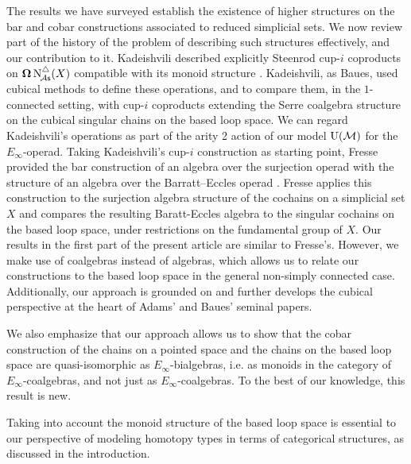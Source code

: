The results we have surveyed establish the existence of higher structures on the bar and cobar constructions associated to reduced simplicial sets.
We now review part of the history of the problem of describing such structures effectively, and our contribution to it.
Kadeishvili described explicitly Steenrod cup-$i$ coproducts on $\operatorname{\mathbf{\Omega}} \operatorname{N^{\triangle}_{\!{\mathcal{A}\mathsf{s}}}}(X)$ compatible with its monoid structure \cite{kadeishvili1999coproducts, kadeishvili2003cupi}.
Kadeishvili, as Baues, used cubical methods to define these operations, and to compare them, in the $1$-connected setting, with cup-$i$ coproducts extending the Serre coalgebra structure on the cubical singular chains on the based loop space.
We can regard Kadeishvili's operations as part of the arity 2 action of our model ${\operatorname{U}(\mathcal{M})}$ for the $E_{\infty}$-operad.
Taking Kadeishvili's cup-$i$ construction as starting point, Fresse provided the bar construction of an algebra over the surjection operad with the structure of an algebra over the Barratt–Eccles operad \cite{fresse2003hopf}.
Fresse applies this construction to the surjection algebra structure of the cochains on a simplicial set $X$ and compares the resulting Baratt-Eccles algebra to the singular cochains on the based loop space, under restrictions on the fundamental group of $X$.
Our results in the first part of the present article are similar to Fresse's.
However, we make use of coalgebras instead of algebras, which allows us to relate our constructions to the based loop space in the general non-simply connected case.
Additionally, our approach is grounded on and further develops the cubical perspective at the heart of Adams' and Baues' seminal papers.

We also emphasize that our approach allows us to show that the cobar construction of the chains on a pointed space and the chains on the based loop space are quasi-isomorphic as $E_{\infty}$-bialgebras, i.e. as monoids in the category of $E_{\infty}$-coalgebras, and not just as $E_{\infty}$-coalgebras. To the best of our knowledge, this result is new.


Taking into account the monoid structure of the based loop space is essential to our perspective of modeling homotopy types in terms of categorical structures, as discussed in the introduction.



